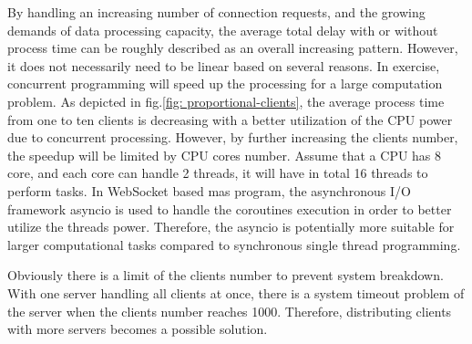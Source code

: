 By handling an increasing number of connection requests, and the growing demands 
of data processing capacity, the average total delay with or without process time can be 
roughly described as an overall increasing pattern. However, it does not necessarily 
need to be linear based on several reasons. In exercise, concurrent programming 
will speed up the processing for a large computation problem. As depicted in 
fig.\ref{fig: proportional-clients}, the average process time from one to ten 
clients is decreasing with a better utilization of the CPU power due to 
concurrent processing. However, by further increasing the clients number, the 
speedup will be limited by CPU cores number. Assume that a CPU has 8 core, 
and each core can handle 2 threads, it will have in total 16 threads to perform tasks.
In WebSocket based \gls{mas} program, the asynchronous I/O framework asyncio is used 
to handle the coroutines execution in order to better utilize the threads power.
Therefore, the asyncio is potentially more suitable for larger computational tasks 
compared to synchronous single thread programming.

Obviously there is a limit of the clients number to prevent system breakdown. 
With one server handling all clients at once, there is a system timeout problem of 
the server when the clients number reaches 1000. Therefore, 
distributing clients with more servers becomes a possible solution. 


